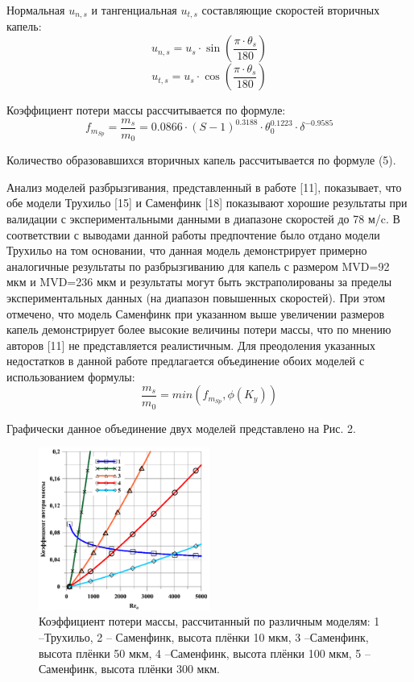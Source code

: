 \documentclass{psta}%
\begin{document}
Нормальная $u_{n,s}$ и тангенциальная $u_{t,s}$ составляющие скоростей вторичных капель:
\begin{equation*}
	u_{n,s} = u_s \cdot \sin\left( \frac{\pi \cdot \theta_s}{180} \right)
\end{equation*}
\begin{equation*}
	u_{t,s} = u_s \cdot \cos\left( \frac{\pi \cdot \theta_s}{180} \right)
\end{equation*}

Коэффициент потери массы рассчитывается по формуле:
\begin{equation*}
	f_{m_{Sp}} = \frac{m_s}{m_0} = 0.0866 \cdot (S - 1)^{0.3188} \cdot \theta_0^{0.1223} \cdot \delta^{-0.9585}
\end{equation*}

Количество образовавшихся вторичных капель рассчитывается по формуле (5).

Анализ моделей разбрызгивания, представленный в работе [11], показывает, что обе модели Трухильо [15] и Саменфинк [18] показывают хорошие результаты при валидации с экспериментальными данными в диапазоне скоростей до 78 м/c.
В соответствии с выводами данной работы предпочтение было отдано модели Трухильо на том основании, что данная модель демонстрирует примерно аналогичные результаты по разбрызгиванию для капель с размером MVD=92 мкм и MVD=236 мкм и результаты могут быть экстраполированы за пределы экспериментальных данных (на диапазон повышенных скоростей).
При этом отмечено, что модель Саменфинк при указанном выше увеличении размеров капель демонстрирует более высокие величины потери массы, что по мнению авторов [11] не представляется реалистичным.
Для преодоления указанных недостатков в данной работе предлагается объединение обоих моделей с использованием формулы:
\begin{equation}
	\frac{m_s}{m_0} = min(f_{m_{Sp}}, \phi(K_y))
\end{equation}

Графически данное объединение двух моделей представлено на Рис. 2.

\begin{figure}[ht]
\centering
\includegraphics[width=0.5\textwidth]{pics/chart2.png}
\caption{Коэффициент потери массы, рассчитанный по различным моделям: 1 –Трухильо, 2 – Саменфинк, высота плёнки 10 мкм, 3 –Саменфинк, высота плёнки 50 мкм, 4 –Саменфинк, высота плёнки 100 мкм, 5 –Саменфинк, высота плёнки 300 мкм.}
\label{fig:chart2}
\end{figure}
\end{document}
